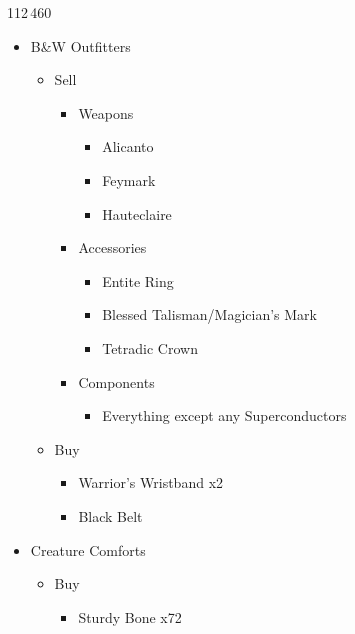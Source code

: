 \begin{shop}{112\,460}
	\begin{multicols}{2}
		\begin{itemize}
			\item B\&W Outfitters
			      \begin{itemize}
				      \item Sell
				            \begin{itemize}
					            \item Weapons
					                  \begin{itemize}
						                  \item Alicanto
						                  \item Feymark
						                  \item Hauteclaire
					                  \end{itemize}
					            \item Accessories
					                  \begin{itemize}
						                  \item Entite Ring
						                  \item Blessed Talisman/Magician's Mark
						                  \item Tetradic Crown
					                  \end{itemize}
					            \item Components
					                  \begin{itemize}
						                  \item Everything except any Superconductors
					                  \end{itemize}
				            \end{itemize}
				      \item Buy
				            \begin{itemize}
					            \item Warrior's Wristband x2
					            \item Black Belt
				            \end{itemize}
			      \end{itemize}
			      \columnbreak
			\item Creature Comforts
			      \begin{itemize}
				      \item Buy
				            \begin{itemize}
					            \item Sturdy Bone x72

\end{itemize}
\end{itemize}
\end{itemize}
\end{multicols}
\end{shop}
